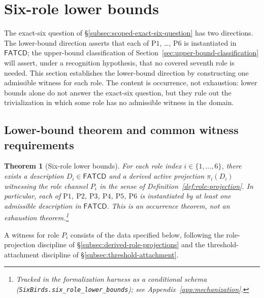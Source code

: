 \documentclass[11pt]{article}
\newtheorem{theorem}{Theorem}[section]
\theoremstyle{definition}
\newcommand{\FATCD}{\ensuremath{\mathsf{FATCD}}}
\newcommand{\Pone}{\ensuremath{\mathrm{P1}}}
\newcommand{\Ptwo}{\ensuremath{\mathrm{P2}}}
\newcommand{\Pthree}{\ensuremath{\mathrm{P3}}}
\newcommand{\Pfour}{\ensuremath{\mathrm{P4}}}
\newcommand{\Pfive}{\ensuremath{\mathrm{P5}}}
\newcommand{\Psix}{\ensuremath{\mathrm{P6}}}
\begin{document}
 \section{Six-role lower bounds}\label{sec:lower-bounds}




The exact-six question of
\S\ref{subsec:scoped-exact-six-question} has two directions. The
lower-bound direction asserts that each of \Pone{}, \ldots, \Psix{}
is instantiated in \FATCD{}; the upper-bound classification of
Section~\ref{sec:upper-bound-classification} will assert, under a recognition
hypothesis, that no covered seventh role is needed. This section establishes the
lower-bound direction by constructing one admissible witness for each
role. The content is occurrence, not exhaustion: lower bounds alone
do not answer the exact-six question, but they rule out the
trivialization in which some role has no admissible witness in the
domain.

\subsection{Lower-bound theorem and common witness requirements}\label{subsec:lower-bound-theorem}

\begin{theorem}[Six-role lower bounds]\label{thm:six-role-lower-bounds}
For each role index \(i \in \{1,\ldots,6\}\), there exists a description
\(D_i \in \FATCD{}\) and a derived active projection
\(\pi_i(D_i)\) witnessing the role channel \(P_i\) in the sense of
Definition~\ref{def:role-projection}. In particular, each of
\Pone{}, \Ptwo{}, \Pthree{}, \Pfour{}, \Pfive{}, \Psix{} is instantiated
by at least one admissible description in \FATCD{}. This is an occurrence
theorem, not an exhaustion theorem.\footnote{Tracked in the formalization harness as a conditional schema (\texttt{SixBirds.six\_role\_lower\_bounds}); see Appendix~\ref{app:mechanization}.}
\end{theorem}

A witness for role \(P_i\) consists of the data specified below,
following the role-projection discipline of
\S\ref{subsec:derived-role-projections} and the threshold-attachment
discipline of \S\ref{subsec:threshold-attachment}.
\end{document}
